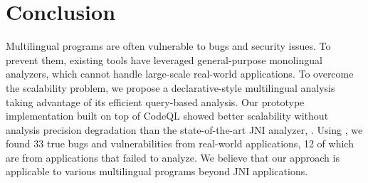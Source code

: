 \section{Conclusion}\label{sec:conclude}
Multilingual programs are often vulnerable to bugs and security issues.
To prevent them, existing tools have leveraged general-purpose
monolingual analyzers, which cannot handle large-scale real-world applications.
To overcome the scalability problem, we propose a declarative-style multilingual analysis
taking advantage of its efficient query-based analysis.
Our prototype implementation \ours built on top of CodeQL
showed better scalability without analysis precision degradation than the
state-of-the-art JNI analyzer, \lees.  Using \ours, we found
33 true bugs and vulnerabilities from real-world applications,
12 of which are from applications that \lees failed to analyze.
We believe that our approach is applicable to various multilingual programs
beyond JNI applications.